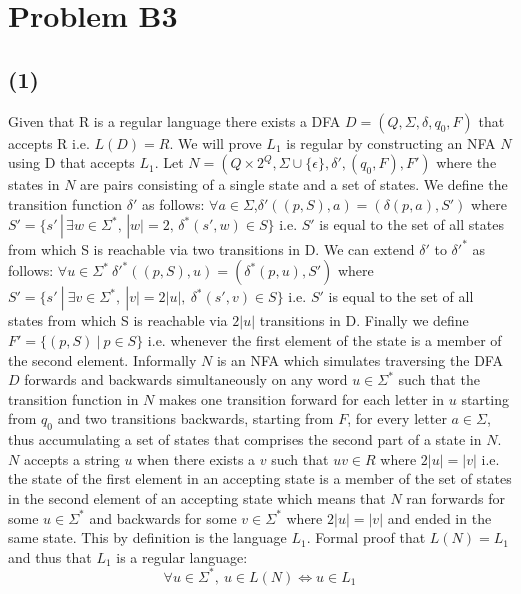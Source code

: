 \documentclass[12pt]{article}
\begin{document}
\section*{Problem B3}
\subsection*{(1)}
  Given that R is a regular language there exists a DFA
  $D = (Q, \Sigma, \delta, q_0, F)$ that accepts R i.e. $L(D) = R$.
  We will prove $L_1$ is regular by constructing
  an NFA $N$ using D that accepts $L_1$. Let $N = (Q \times 2^Q,
  \Sigma \cup \{\epsilon\}, \delta{'}, (q_0 , F), F')$ where the states in $N$
  are pairs consisting of a single state and a set of states. We define the
  transition function $\delta{'}$ as follows:
  \newline
  \indent $\forall a \in \Sigma$,\:$\delta{'}((p,S), a) = (\delta(p,a), S')$ where
  $S'= \{s'\,|\,\exists w \in \Sigma^*,\,|w| = 2,\, \delta^*(s',w) \in S\}$
  \newline
  \indent i.e. $S'$ is equal to the set of all states from which S is reachable
  via two transitions in D.
  \newline
  We can extend $\delta{'}$ to $\delta{'}^*$ as follows:
  \newline
  \indent $\forall u \in \Sigma^*\: \delta{'}^* ((p,S),u) = (\delta^* (p, u),S')$
  where $S' = \{s'\:|\:\exists v \in \Sigma^* ,\: |v|=2|u| ,\:
  \delta^* (s', v) \in S\}$
  \newline
  \indent i.e. $S'$ is equal to the set of all states from which S is reachable
  via $2|u|$ transitions in D.
  \newline
  Finally we define $F'=\{(p,S)\:|\: p \in S\}$ i.e. whenever the first element
  of the state is a member of the second element. Informally $N$ is an NFA which
  simulates traversing the DFA $D$ forwards and backwards simultaneously on any
  word $u \in \Sigma^*$ such that the transition function in $N$ makes one
  transition forward for each letter in $u$ starting from $q_0$ and two
  transitions backwards, starting from $F$, for every letter $a\in\Sigma$, thus
  accumulating a set of states that comprises the second part of a state in $N$.
  $N$ accepts a string $u$ when there exists a $v$ such that $uv \in R$ where
  $2|u| = |v|$ i.e. the state of the first element in an accepting state
  is a member of the set of states in the second element of an accepting state
  which means that $N$ ran forwards for some $u \in \Sigma^*$ and backwards for
  some $v \in \Sigma^*$ where $2|u| = |v|$ and ended in the same state.
  This by definition is the language $L_1$. Formal proof that $L(N) = L_1$ and
  thus that $L_1$ is a regular language:
  $$\forall u \in \Sigma^* ,\: u \in L(N) \iff u \in L_1$$
\end{document}
